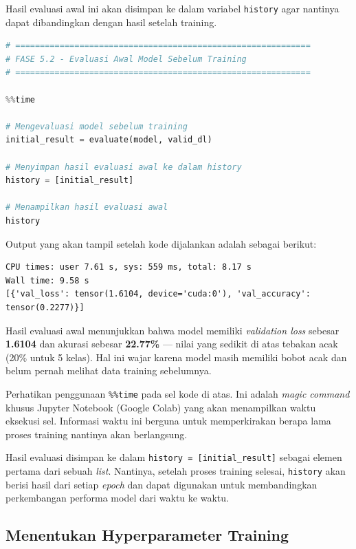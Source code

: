 Hasil evaluasi awal ini akan disimpan ke dalam variabel \texttt{history} agar nantinya dapat dibandingkan dengan hasil setelah training.

\begin{lstlisting}[language=Python, caption=Evaluasi awal model sebelum training]
# ============================================================
# FASE 5.2 - Evaluasi Awal Model Sebelum Training
# ============================================================

%%time

# Mengevaluasi model sebelum training
initial_result = evaluate(model, valid_dl)

# Menyimpan hasil evaluasi awal ke dalam history
history = [initial_result]

# Menampilkan hasil evaluasi awal
history
\end{lstlisting}

Output yang akan tampil setelah kode dijalankan adalah sebagai berikut:

\begin{outputcode}[H]
\begin{lstlisting}[language={}]
CPU times: user 7.61 s, sys: 559 ms, total: 8.17 s
Wall time: 9.58 s
[{'val_loss': tensor(1.6104, device='cuda:0'), 'val_accuracy': tensor(0.2277)}]
\end{lstlisting}
\caption{Output evaluasi awal model}
\end{outputcode}

Hasil evaluasi awal menunjukkan bahwa model memiliki \textit{validation loss} sebesar \textbf{1.6104} dan akurasi sebesar \textbf{22.77\%} --- nilai yang sedikit di atas tebakan acak (20\% untuk 5 kelas). Hal ini wajar karena model masih memiliki bobot acak dan belum pernah melihat data training sebelumnya.

Perhatikan penggunaan \texttt{\%\%time} pada sel kode di atas. Ini adalah \textit{magic command} khusus Jupyter Notebook (Google Colab) yang akan menampilkan waktu eksekusi sel. Informasi waktu ini berguna untuk memperkirakan berapa lama proses training nantinya akan berlangsung.

Hasil evaluasi disimpan ke dalam \texttt{history = [initial\_result]} sebagai elemen pertama dari sebuah \textit{list}. Nantinya, setelah proses training selesai, \texttt{history} akan berisi hasil dari setiap \textit{epoch} dan dapat digunakan untuk membandingkan perkembangan performa model dari waktu ke waktu.

\subsection{Menentukan Hyperparameter Training}

